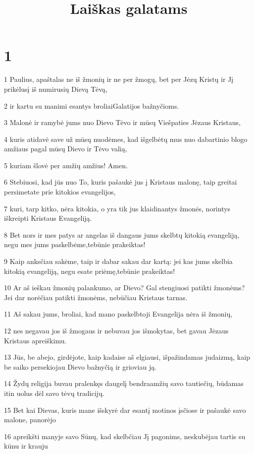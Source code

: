 

\title{Laiškas galatams}

\chapter{1}


\par 1 Paulius, apaštalas ne iš žmonių ir ne per žmogų, bet per Jėzų Kristų ir Jį prikėlusį iš numirusių Dievą Tėvą, 
\par 2 ir kartu su manimi esantys broliai­Galatijos bažnyčioms. 
\par 3 Malonė ir ramybė jums nuo Dievo Tėvo ir mūsų Viešpaties Jėzaus Kristaus, 
\par 4 kuris atidavė save už mūsų nuodėmes, kad išgelbėtų mus nuo dabartinio blogo amžiaus pagal mūsų Dievo ir Tėvo valią, 
\par 5 kuriam šlovė per amžių amžius! Amen. 
\par 6 Stebiuosi, kad jūs nuo To, kuris pašaukė jus į Kristaus malonę, taip greitai persimetate prie kitokios evangelijos, 
\par 7 kuri, tarp kitko, nėra kitokia, o yra tik jus klaidinantys žmonės, norintys iškreipti Kristaus Evangeliją. 
\par 8 Bet nors ir mes patys ar angelas iš dangaus jums skelbtų kitokią evangeliją, negu mes jums paskelbėme,­tebūnie prakeiktas! 
\par 9 Kaip anksčiau sakėme, taip ir dabar sakau dar kartą: jei kas jums skelbia kitokią evangeliją, negu esate priėmę,­tebūnie prakeiktas! 
\par 10 Ar aš ieškau žmonių palankumo, ar Dievo? Gal stengiuosi patikti žmonėms? Jei dar norėčiau patikti žmonėms, nebūčiau Kristaus tarnas. 
\par 11 Aš sakau jums, broliai, kad mano paskelbtoji Evangelija nėra iš žmonių, 
\par 12 nes negavau jos iš žmogaus ir nebuvau jos išmokytas, bet gavau Jėzaus Kristaus apreiškimu. 
\par 13 Jūs, be abejo, girdėjote, kaip kadaise aš elgiausi, išpažindamas judaizmą, kaip be saiko persekiojau Dievo bažnyčią ir grioviau ją. 
\par 14 Žydų religija buvau pralenkęs daugelį bendraamžių savo tautiečių, būdamas itin uolus dėl savo tėvų tradicijų. 
\par 15 Bet kai Dievas, kuris mane išskyrė dar esantį motinos įsčiose ir pašaukė savo malone, panorėjo 
\par 16 apreikšti manyje savo Sūnų, kad skelbčiau Jį pagonims, neskubėjau tartis su kūnu ir krauju 
